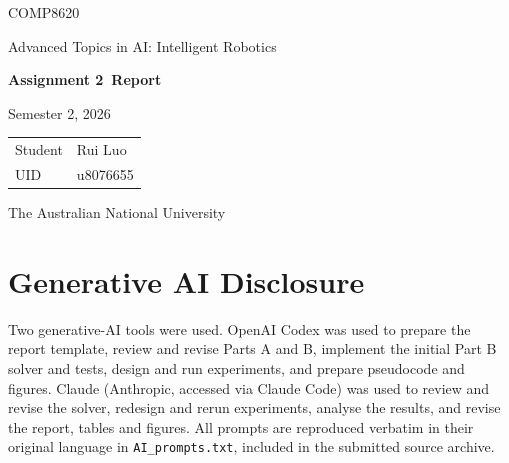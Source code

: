 \documentclass[11pt,a4paper]{article}
\newcommand{\studentname}{Rui Luo}
\newcommand{\studentuid}{u8076655}
\newcommand{\coursecode}{COMP8620}
\newcommand{\coursetitle}{Advanced Topics in AI: Intelligent Robotics}
\newcommand{\assignmenttitle}{Assignment 2}
\newcommand{\semester}{Semester 2, 2026}
\begin{document}

\begin{titlepage}
  \centering
  \vspace*{30mm}
  {\Large\coursecode\par}
  \vspace{4mm}
  {\Large\coursetitle\par}
  \vspace{16mm}
  {\huge\bfseries\assignmenttitle\ Report\par}
  \vspace{5mm}
  {\large\semester\par}
  \vfill
  \begin{tabular}{@{}ll@{}}
    \toprule
    Student & \studentname \\
    UID & \studentuid \\
    \bottomrule
  \end{tabular}
  \vfill
  {\large The Australian National University\par}
  \vspace{10mm}
\end{titlepage}

\section*{Generative AI Disclosure}
\label{sec:ai-disclosure}

Two generative-AI tools were used. OpenAI Codex was used to prepare the
report template, review and revise Parts A and B, implement the initial
Part B solver and tests, design and run experiments, and prepare pseudocode
and figures. Claude (Anthropic, accessed via Claude Code) was used to review
and revise the solver, redesign and rerun experiments, analyse the results,
and revise the report, tables and figures. All prompts are reproduced
verbatim in their original language in \texttt{AI\_prompts.txt}, included
in the submitted source archive.

\end{document}
